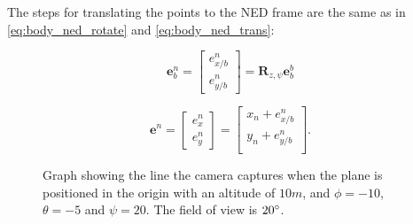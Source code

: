 The steps for translating the points to the NED frame are the same as in \eqref{eq:body_ned_rotate} and \eqref{eq:body_ned_trans}:

\begin{equation}
	\bm{e}_b^n =
	\begin{bmatrix}
		e^n_{x/b} \\ e^n_{y/b}
	\end{bmatrix}
	= \bm{R}_{z,\psi} \bm{e}_b^b
\end{equation}

\begin{equation}
	\bm{e}^n =
	\begin{bmatrix}
		e^n_{x} \\ e^n_{y}
	\end{bmatrix}
	=
	\begin{bmatrix}
		x_n + e^n_{x/b} \\
		y_n + e^n_{y/b} \\
	\end{bmatrix}.
\end{equation}

\begin{figure}[!ht]
    \centering
    \caption{Graph showing the line the camera captures when the plane is positioned in the origin with an altitude of $10m$, and $\phi=-10$, $\theta=-5$ and $\psi=20$. The field of view is $20\degree$.}
\end{figure}